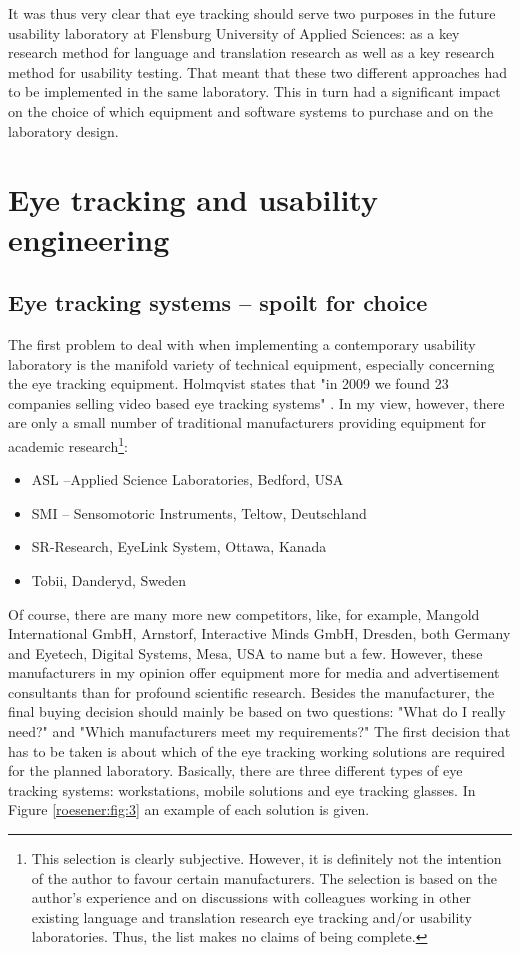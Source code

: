 \documentclass[output=paper]{langsci/langscibook}
\begin{document}
It was thus very clear that eye tracking should serve two purposes in the future usability laboratory at Flensburg University of Applied Sciences: as a key research method for language and translation research as well as a key research method for usability testing. That meant that these two different approaches had to be implemented in the same laboratory. This in turn had a significant impact on the choice of which equipment and software systems to purchase and on the laboratory design.


\section{Eye tracking and usability engineering }

\subsection{Eye tracking systems – spoilt for choice }

The first problem to deal with when implementing a contemporary usability laboratory is the manifold variety of technical equipment, especially concerning the eye tracking equipment. Holmqvist states that "in 2009 we found 23 companies selling video based eye tracking systems" \citep[p. 12]{Holmqvist2011}. In my view, however, there are only a small number of traditional manufacturers providing equipment for academic research\footnote{ This selection is clearly subjective. However, it is definitely not the intention of the author to favour certain manufacturers. The selection is based on the author’s experience and on discussions with colleagues working in other existing language and translation research eye tracking and/or usability laboratories. Thus, the list makes no claims of being complete.}: 

\begin{itemize}
\item ASL –Applied Science Laboratories, Bedford, USA
\item SMI – Sensomotoric Instruments, Teltow, Deutschland
\item SR-Research, EyeLink System, Ottawa, Kanada
\item Tobii, Danderyd, Sweden 
\end{itemize}


Of course, there are many more new competitors, like, for example, Mangold International GmbH, Arnstorf, Interactive Minds GmbH, Dresden, both Germany and Eyetech, Digital Systems, Mesa, USA to name but a few. However, these manufacturers in my opinion offer equipment more for media and advertisement consultants than for profound scientific research. Besides the manufacturer, the final buying decision should mainly be based on two questions: "What do I really need?" and "Which manufacturers meet my requirements?" The first decision that has to be taken is about which of the eye tracking working solutions are required for the planned laboratory. Basically, there are three different types of eye tracking systems: workstations, mobile solutions and eye tracking glasses. In Figure \ref{roesener:fig:3} an example of each solution is given.
\end{document}
